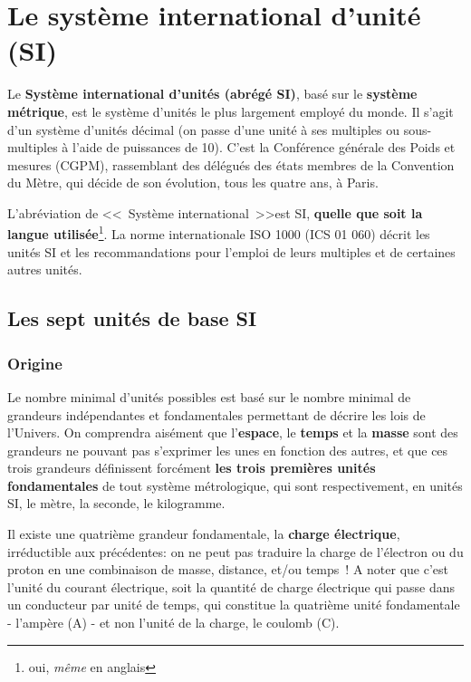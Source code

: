 \chapter{Le système international d'unité (SI)}
\label{chap:si}

Le \textbf{Système international d'unités (abrégé SI)}, basé sur le \textbf{système métrique}, est le système d'unités le plus largement employé du monde. Il s'agit d'un système d'unités décimal (on passe d'une unité à ses multiples ou sous-multiples à l'aide de puissances de 10). C'est la Conférence générale des Poids et mesures (CGPM), rassemblant des délégués des états membres de la Convention du Mètre, qui décide de son évolution, tous les quatre ans, à Paris.

L'abréviation de \textless\textless\ Système international\ \textgreater\textgreater est SI, \textbf{quelle que soit la langue utilisée}\footnote{oui, \textit{même} en anglais}. La norme internationale ISO 1000 (ICS 01 060) décrit les unités SI et les recommandations pour l'emploi de leurs multiples et de certaines autres unités.

\section{Les sept unités de base SI}

\subsection{Origine}

Le nombre minimal d'unités possibles est basé sur le nombre minimal de grandeurs indépendantes et fondamentales permettant de décrire les lois de l'Univers. On comprendra aisément que l'\textbf{espace}, le \textbf{temps} et la \textbf{masse} sont des grandeurs ne pouvant pas s'exprimer les unes en fonction des autres, et que ces trois grandeurs définissent forcément \textbf{les trois premières unités fondamentales} de tout système métrologique, qui sont respectivement, en unités SI, le mètre, la seconde, le kilogramme.

Il existe une quatrième grandeur fondamentale, la \textbf{charge électrique}, irréductible aux  précédentes: on ne peut pas traduire la charge de l'électron ou du proton en une combinaison de masse, distance, et/ou temps~! A noter que c'est l'unité du courant électrique, soit la quantité de charge électrique qui passe dans un conducteur par unité de temps, qui constitue la quatrième unité fondamentale - l'ampère (A) - et non l'unité de la charge, le coulomb (C).


